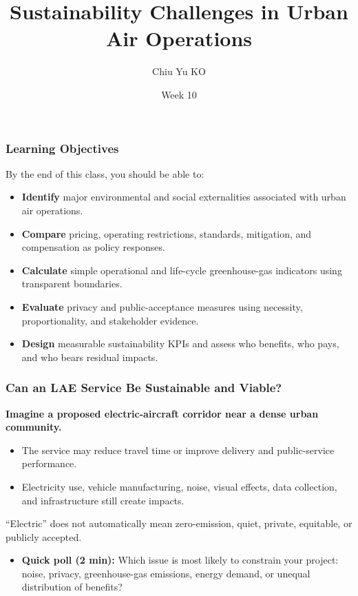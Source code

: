 \documentclass{beamer}
\begin{document}
\begin{frame}
  \title{Sustainability Challenges in Urban Air Operations}
  \author{Chiu Yu KO}
  \date{Week 10}
  \titlepage
\end{frame}

\begin{frame}[t]
\frametitle{Learning Objectives}
By the end of this class, you should be able to:
\begin{itemize}
\item \textbf{Identify} major environmental and social externalities associated with urban air operations.
\item \textbf{Compare} pricing, operating restrictions, standards, mitigation, and compensation as policy responses.
\item \textbf{Calculate} simple operational and life-cycle greenhouse-gas indicators using transparent boundaries.
\item \textbf{Evaluate} privacy and public-acceptance measures using necessity, proportionality, and stakeholder evidence.
\item \textbf{Design} measurable sustainability KPIs and assess who benefits, who pays, and who bears residual impacts.
\end{itemize}
\end{frame}

\begin{frame}[t]
\frametitle{Can an LAE Service Be Sustainable and Viable?}
\textbf{Imagine a proposed electric-aircraft corridor near a dense urban community.}
\begin{itemize}
\item The service may reduce travel time or improve delivery and public-service performance.
\item Electricity use, vehicle manufacturing, noise, visual effects, data collection, and infrastructure still create impacts.
\end{itemize}
\vspace{0.3cm}
``Electric'' does not automatically mean zero-emission, quiet, private, equitable, or publicly accepted.
\begin{itemize}
\item \textbf{Quick poll (2 min):} Which issue is most likely to constrain your project: noise, privacy, greenhouse-gas emissions, energy demand, or unequal distribution of benefits?
\end{itemize}
\end{frame}
\end{document}
